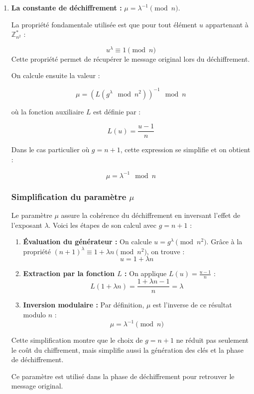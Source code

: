 \documentclass[12pt,a4paper]{report}
\begin{document}
\begin{enumerate}
\begin{enumerate}
    \item \textbf{Garantie structurelle :} Il est mathématiquement prouvé que $n+1$ possède un ordre égal à $n$ dans le groupe $\mathbb{Z}^*_{n^2}$. Cette propriété garantit que la fonction de chiffrement est une bijection, assurant ainsi qu'aucun message ne sera "perdu" ou ne provoquera de collision lors du déchiffrement.
\end{enumerate}


    \item \textbf{La constante de déchiffrement :} $\mu = \lambda^{-1} \pmod n$.

    La propriété fondamentale utilisée est que pour tout élément $u$ appartenant à
$\mathbb{Z}_{n^2}^{*}$ :

\[
u^{\lambda} \equiv 1 \pmod{n}
\]
Cette propriété permet de récupérer le message original lors du déchiffrement.


On calcule ensuite la valeur :

\[
\mu = (L(g^{\lambda} \mod n^2))^{-1} \mod n
\]

où la fonction auxiliaire $L$ est définie par :

\[
L(u) = \frac{u-1}{n}
\]

Dans le cas particulier où $g = n + 1$, cette expression se simplifie et on
obtient :

\[
\mu = \lambda^{-1} \mod n
\]


\subsubsection{Simplification du paramètre $\mu$}

Le paramètre $\mu$ assure la cohérence du déchiffrement en inversant l'effet de l'exposant $\lambda$. Voici les étapes de son calcul avec $g = n+1$ :

\begin{enumerate}
    \item \textbf{Évaluation du générateur :} On calcule $u = g^\lambda \pmod{n^2}$. 
    Grâce à la propriété $(n+1)^\lambda \equiv 1 + \lambda n \pmod{n^2}$, on trouve :
    \[ u = 1 + \lambda n \]
    \item \textbf{Extraction par la fonction $L$ :} On applique $L(u) = \frac{u-1}{n}$ :
    \[ L(1 + \lambda n) = \frac{1 + \lambda n - 1}{n} = \lambda \]
    \item \textbf{Inversion modulaire :} Par définition, $\mu$ est l'inverse de ce résultat modulo $n$ :
    \[ \mu = \lambda^{-1} \pmod n \]
\end{enumerate}

Cette simplification montre que le choix de $g=n+1$ ne réduit pas seulement le coût du chiffrement, mais simplifie aussi la génération des clés et la phase de déchiffrement.

Ce paramètre est utilisé dans la phase de déchiffrement pour retrouver le
message original.

\end{enumerate}
\end{document}
